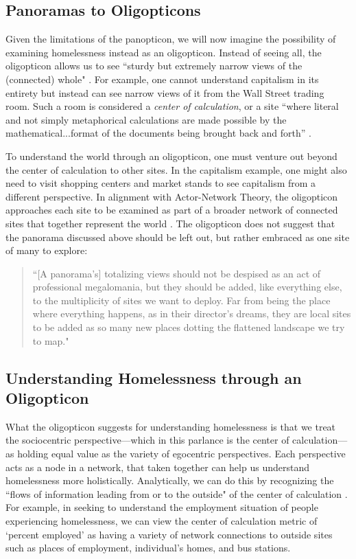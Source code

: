 \subsection{Panoramas to Oligopticons}
Given the limitations of the panopticon, we will now imagine the possibility of examining homelessness instead as an oligopticon. Instead of seeing all, the oligopticon allows us to see “sturdy but extremely narrow views of the (connected) whole" \citep{Latour2005ANT}. For example, one cannot understand capitalism in its entirety but instead can see narrow views of it from the Wall Street trading room. Such a room is considered a \textit{center of calculation}, or a site ``where literal and not simply metaphorical calculations are made possible by the mathematical...format of the documents being brought back and forth'' \citep{Latour2005ANT}.

To understand the world through an oligopticon, one must venture out beyond the center of calculation to other sites. In the capitalism example, one might also need to visit shopping centers and market stands to see capitalism from a different perspective. In alignment with Actor-Network Theory, the oligopticon approaches each site to be examined as part of a broader network of connected sites that together represent the world \citep{Latour2005ANT}. The oligopticon does not suggest that the panorama discussed above should be left out, but rather embraced as one site of many to explore:

\begin{quote}\singlespacing ``[A panorama's] totalizing views should not be despised as an act of professional megalomania, but they should be added, like everything else, to the multiplicity of sites we want to deploy. Far from being the place where everything happens, as in their director’s dreams, they are local sites to be added as so many new places dotting the flattened landscape we try to map." \citep{Latour2005ANT} \end{quote}

\subsection{Understanding Homelessness through an Oligopticon}

What the oligopticon suggests for understanding homelessness is that we treat the sociocentric perspective---which in this parlance is the center of calculation---as holding equal value as the variety of egocentric perspectives. Each perspective acts as a node in a network, that taken together can help us understand homelessness more holistically. Analytically, we can do this by recognizing the ``flows of information leading from or to the outside" of the center of calculation \citep{Latour2005ANT}. For example, in seeking to understand the employment situation of people experiencing homelessness, we can view the center of calculation metric of `percent employed' as having a variety of network connections to outside sites such as places of employment, individual's homes, and bus stations.

